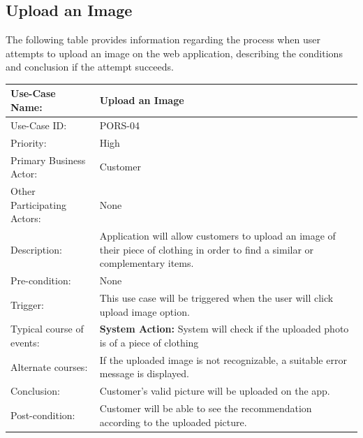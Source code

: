 \subsection{Upload an Image}
The following table provides information regarding the process when user attempts to upload an image on the web application, describing the conditions and conclusion if the attempt succeeds. 
\begin{center}
    \begin{tabular}{ @{}|p{5cm}||p{7cm}|  }
    \hline
    Use-Case Name: & Upload an Image  \\ \hline
    Use-Case ID: & PORS-04 \\ \hline
    Priority: & High \\ \hline
    Primary Business Actor: & Customer \\ \hline
    Other Participating Actors: & None \\ \hline
    Description: & Application will allow customers to upload an image of their piece of clothing in order to find a similar or complementary items. \\ \hline
    Pre-condition: & None \\ \hline
    Trigger: & This use case will be triggered when the user will click upload image option. \\ \hline
    Typical course of events: & \textbf{System Action:} \newline System will check if the uploaded photo is of a piece of clothing
 \\ \hline
    Alternate courses: & If the uploaded image is not recognizable, a suitable error message is displayed. \\ \hline
    Conclusion: & Customer’s valid picture will be uploaded on the app. \\ \hline
    Post-condition: & Customer will be able to see the recommendation according to the uploaded picture. \\ \hline
    \end{tabular}
\end{center}

